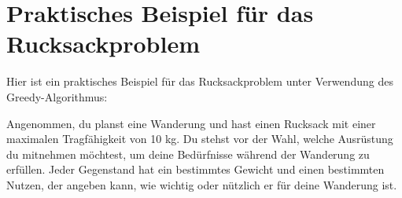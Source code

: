 \documentclass[12pt]{report}
\begin{document}


\pagebreak
\section{Praktisches Beispiel für das Rucksackproblem}






Hier ist ein praktisches Beispiel für das  Rucksackproblem unter Verwendung des Greedy-Algorithmus:

Angenommen, du planst eine Wanderung und hast einen Rucksack mit einer maximalen Tragfähigkeit von 10 kg. Du stehst vor der Wahl, welche Ausrüstung du mitnehmen möchtest, um deine Bedürfnisse während der Wanderung zu erfüllen. Jeder Gegenstand hat ein bestimmtes Gewicht und einen bestimmten Nutzen, der angeben kann, wie wichtig oder nützlich er für deine Wanderung ist.
\end{document}
